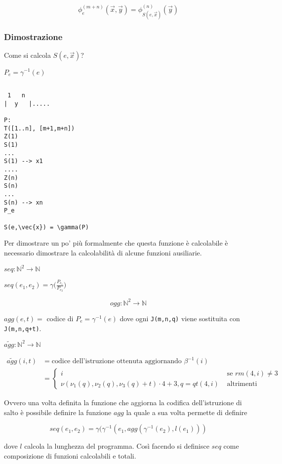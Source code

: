 $$
\phi_{e}^{(m+n)}(\vec{x},\vec{y}) = \phi_{S(e,\vec{x})}^{(n)}(\vec{y})
$$

\subsubsection{Dimostrazione}

Come si calcola $ S(e,\vec{x}) $?

$ P_e = \gamma^{-1}(e) $ 

\begin{verbatim}
 
 1   n
|  y   |..... 

P:
T([1..n], [m+1,m+n])
Z(1)
S(1)
...
S(1) --> x1
....
Z(n)
S(n)
...
S(n) --> xn
P_e

S(e,\vec{x}) = \gamma(P)

\end{verbatim}

Per dimostrare un po' più formalmente che questa funzione è calcolabile è necessario dimostrare la calcolabilità di alcune funzioni ausiliarie.

$ seq : \mathbb{N}^2 \rightarrow  \mathbb{N}$

$ seq(e_1,e_2) = \gamma\Big(\frac{P_{e_1}}{P_{e_2}} \Big)$

$$
ogg:  \mathbb{N}^2 \rightarrow  \mathbb{N}
$$

$agg(e,t) = $ codice di $ P_e = \gamma^{-1}(e)$ dove ogni \texttt{J(m,n,q)} viene sostituita con \texttt{J(m,n,q+t)}.

$\widetilde{agg}:  \mathbb{N}^2 \rightarrow  \mathbb{N}$

\begin{align*}
\widetilde{agg}(i,t) &= \text{codice dell'istruzione ottenuta aggiornando } \beta^{-1}(i) \\
								 &= \begin{cases}
								 i &\text{ se } rm(4,i) \neq 3 \\
								 \nu(\nu_1(q), \nu_2(q), \nu_3(q)+t)\cdot 4 +3, q = qt(4,i) &\text{ altrimenti}
								 \end{cases}
\end{align*}

Ovvero una volta definita la funzione che aggiorna la codifica dell'istruzione di salto è possibile definire la funzione $ agg $ la quale a sua volta permette di definire 

$$
seq(e_1, e_2) = \gamma(\gamma^{-1}(e_1, agg(\gamma^{-1}(e_2), l(e_1)))
$$

dove $ l $ calcola la lunghezza del programma. Così facendo si definisce $ seq $ come composizione di funzioni calcolabili e totali.

